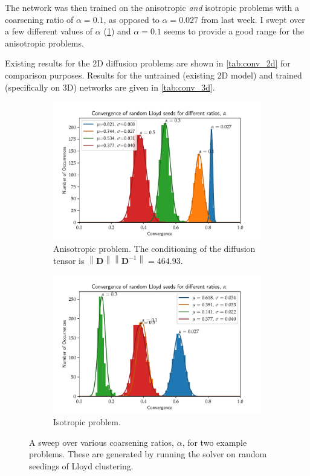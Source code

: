 \documentclass{article}
\newcommand{\norm}[1]{\left\lVert#1\right\rVert}
\newcommand{\mat}[1]{\bm{{#1}}}
\begin{document}
The network was then trained on the anisotropic \textit{and} isotropic problems with a coarsening ratio of $\alpha=0.1$, as opposed to $\alpha=0.027$ from last week.  I swept over a few different values of $\alpha$ (\cref{fig:histograms}) and $\alpha=0.1$ seems to provide a good range for the anisotropic problems.

Existing results for the 2D diffusion problems are shown in \cref{tab:conv_2d} for comparison purposes.  Results for the untrained (existing 2D model) and trained (specifically on 3D) networks are given in \cref{tab:conv_3d}.

\begin{figure}[!hb]
  \centering
  \begin{subfigure}[t]{0.49\textwidth}
    \centering
    \includegraphics[width=\textwidth]{hist_aniso.pdf}
    \caption{Anisotropic problem.  The conditioning of the diffusion tensor is $\norm{\mat{D}}\norm{\mat{D}^{-1}}=464.93$.}
  \end{subfigure}
  \begin{subfigure}[t]{0.49\textwidth}
    \centering
    \includegraphics[width=\textwidth]{hist_iso.pdf}
    \caption{Isotropic problem.}
  \end{subfigure}
  \caption{A sweep over various coarsening ratios, $\alpha$, for two example problems.  These are generated by running the solver on random seedings of Lloyd clustering.}
  \label{fig:histograms}
\end{figure}
\end{document}
